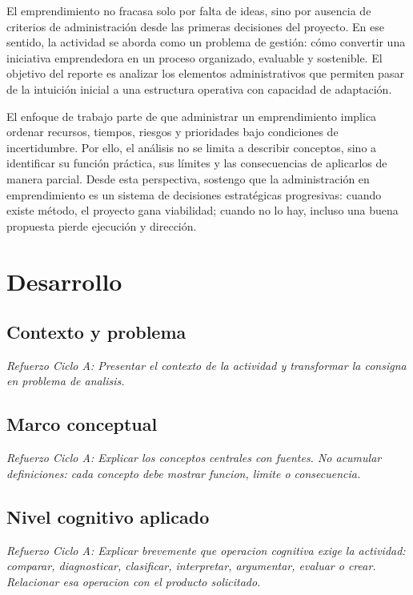 \documentclass[
	spanish,
	letterpaper, oneside
]{article}
\begin{document}
El emprendimiento no fracasa solo por falta de ideas, sino por ausencia de criterios de administración desde las primeras decisiones del proyecto. En ese sentido, la actividad se aborda como un problema de gestión: cómo convertir una iniciativa emprendedora en un proceso organizado, evaluable y sostenible. El objetivo del reporte es analizar los elementos administrativos que permiten pasar de la intuición inicial a una estructura operativa con capacidad de adaptación.

El enfoque de trabajo parte de que administrar un emprendimiento implica ordenar recursos, tiempos, riesgos y prioridades bajo condiciones de incertidumbre. Por ello, el análisis no se limita a describir conceptos, sino a identificar su función práctica, sus límites y las consecuencias de aplicarlos de manera parcial. Desde esta perspectiva, sostengo que la administración en emprendimiento es un sistema de decisiones estratégicas progresivas: cuando existe método, el proyecto gana viabilidad; cuando no lo hay, incluso una buena propuesta pierde ejecución y dirección.

\section{Desarrollo}

\subsection{Contexto y problema}

\textit{Refuerzo Ciclo A: Presentar el contexto de la actividad y transformar la consigna en problema de analisis.}

\subsection{Marco conceptual}

\textit{Refuerzo Ciclo A: Explicar los conceptos centrales con fuentes. No acumular definiciones: cada concepto debe mostrar funcion, limite o consecuencia.}

\subsection{Nivel cognitivo aplicado}

\textit{Refuerzo Ciclo A: Explicar brevemente que operacion cognitiva exige la actividad: comparar, diagnosticar, clasificar, interpretar, argumentar, evaluar o crear. Relacionar esa operacion con el producto solicitado.}
\end{document}

